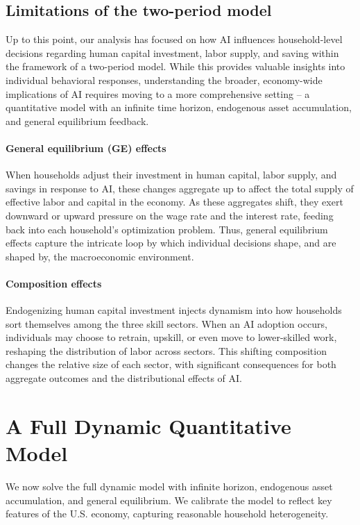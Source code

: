 \documentclass[12pt,english]{article}
\numberwithin{equation}{section}
\begin{document}
\subsection{Limitations of the two-period model}
Up to this point, our analysis has focused on how AI influences household-level decisions regarding human capital investment, labor supply, and saving within the framework of a two-period model. While this provides valuable insights into individual behavioral responses, understanding the broader, economy-wide implications of AI requires moving to a more comprehensive setting -- a quantitative model with an infinite time horizon, endogenous asset accumulation, and general equilibrium feedback.

\paragraph{General equilibrium (GE) effects} When households adjust their investment in human capital, labor supply, and savings in response to AI, these changes aggregate up to affect the total supply of effective labor and capital in the economy. As these aggregates shift, they exert downward or upward pressure on the wage rate and the interest rate, feeding back into each household’s optimization problem. Thus, general equilibrium effects capture the intricate loop by which individual decisions shape, and are shaped by, the macroeconomic environment.

\paragraph{Composition effects} Endogenizing human capital investment injects dynamism into how households sort themselves among the three skill sectors. When an AI adoption occurs, individuals may choose to retrain, upskill, or even move to lower-skilled work, reshaping the distribution of labor across sectors. This shifting composition changes the relative size of each sector, with significant consequences for both aggregate outcomes and the distributional effects of AI.


\section{A Full Dynamic Quantitative Model \protect\label{sec:quant_model}}

We now solve the full dynamic model with infinite horizon, endogenous asset accumulation, and general equilibrium. 
We calibrate the model to reflect key features of the U.S. economy,
capturing reasonable household heterogeneity. 
\end{document}
